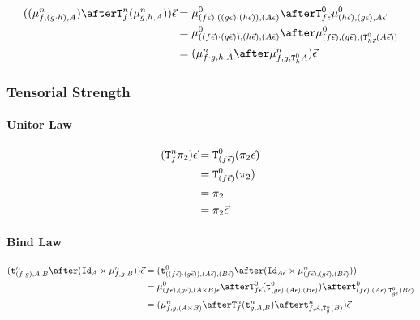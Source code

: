 \documentclass{report}
\begin{document}
\begin{align}
    ((\bindn{f}{(g\dot h)}{A})\after\Tn{f}{(\bindn{g}{h}{A})})\ev &= \bindz{(f\ev)}{((g\ev)\dot(h\ev))}{(A\ev)}\after\Tz{f\ev}{\bindz{(h\ev)}{(g\ev)}{A\ev}}\\
    &= \bindz{((f\ev)\dot(g\ev))}{(h\ev)}{(A\ev)}\after\bindz{(f\ev)}{(g\ev)}{(\Tz{h\ev}{(A\ev)})}\\
    & = (\bindn{f\dot g}{h}{A}\after\bindn{f}{g}{\Tz{h}{A}})\ev
\end{align}
\subsubsection{Tensorial Strength}

\paragraph{Unitor Law}
\begin{align}
    (\texttt{T}^n_{f}\pi_2)\vec{\epsilon}&= \texttt{T}^0_{(f\vec{\epsilon})}(\pi_2\vec{\epsilon})\\
    & =  \texttt{T}^0_{(f\vec{\epsilon})}(\pi_2)\\
    & = \pi_2\\
    &= \pi_2\vec{\epsilon}
\end{align}

\paragraph{Bind Law}


\begin{align}
    (\tstrengthn{(f\dot g)}{A}{B}\after (\Id{A}\times \bindn{f}{g}{B}))\ev & = (\tstrengthz{((f\ev)\dot (g\ev))}{(A\ev)}{(B\ev)}\after (\Id{A\ev}\times \bindn{(f\ev)}{(g\ev)}{(B\ev)}))\\
    & = \bindz{(f\ev)}{(g\ev)}{(A\times B)\ev}\after\Tz{f\ev}{(\tstrengthz{(g\ev)}{(A\ev)}{(B\ev)})}\after\tstrengthz{(f\ev)}{(A\ev)}{\Tz{g\ev}{(B\ev)}}\\
    & = (\bindn{f}{g}{(A\times B)}\after\Tn{f}{(\tstrengthn{g}{A}{B})}\after\tstrengthn{f}{A}{\Tn{g}{(B)}})\ev
\end{align}
\end{document}
